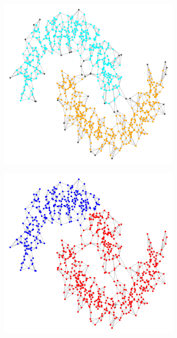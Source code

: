 \documentclass{article}
\newcommand{\1}{\mathbf{1}}
\theoremstyle{aldenthm}
\theoremstyle{aldenrmrk}
\begin{document}
\begin{figure}
\begin{adjustbox}{minipage=\linewidth}
		\begin{subfigure}{.24\linewidth}
			\includegraphics[width=\linewidth]{example2plots/row2_true_density_cluster}
			\caption{}
		\end{subfigure}
		\begin{subfigure}{.24\linewidth}
			\includegraphics[width=\linewidth]{example2plots/row2_ppr_cluster}

\end{subfigure}
\end{adjustbox}
\end{figure}
\end{document}
